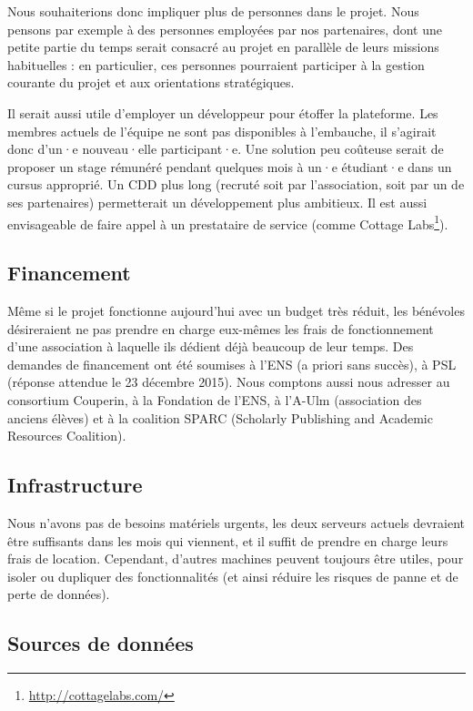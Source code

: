 \documentclass[a4paper]{article}
\begin{document}
Nous souhaiterions donc impliquer
plus de personnes dans le projet. Nous pensons par exemple à des personnes employées par nos
partenaires, dont une petite partie du temps serait consacré au projet en parallèle
de leurs missions habituelles : en particulier, 
ces personnes pourraient participer à la gestion courante
du projet et aux orientations stratégiques.

Il serait aussi utile d'employer un développeur pour étoffer la plateforme.
Les membres actuels de l'équipe ne sont pas disponibles à l'embauche, il s'agirait donc
d'un·e nouveau·elle participant·e. Une solution peu coûteuse
serait de proposer un stage rémunéré pendant quelques mois à un·e étudiant·e
dans un cursus approprié. Un CDD plus long (recruté soit par l'association,
soit par un de ses partenaires) permetterait un développement plus ambitieux.
Il est aussi envisageable de faire appel à un prestataire de service (comme Cottage
Labs\footnote{\url{http://cottagelabs.com/}}).

\subsection{Financement}

Même si le projet fonctionne aujourd'hui avec un budget très réduit, les bénévoles désireraient ne pas prendre en charge eux-mêmes les frais de fonctionnement d'une association à laquelle ils dédient déjà beaucoup de leur temps. Des demandes de financement ont été soumises à l'ENS (a priori sans succès),
à PSL (réponse attendue le 23 décembre 2015). Nous comptons aussi nous adresser au consortium Couperin, à la Fondation de l'ENS, à l'A-Ulm (association des anciens élèves) et à la coalition SPARC (Scholarly Publishing and Academic Resources Coalition).

\subsection{Infrastructure}

Nous n'avons pas de besoins matériels urgents, les deux serveurs actuels devraient être suffisants dans les mois qui viennent, et il suffit de prendre en charge leurs frais de location. Cependant, d'autres machines peuvent toujours être utiles, pour isoler ou dupliquer des fonctionnalités (et ainsi réduire les risques de panne et de perte de données).

\subsection{Sources de données}
\end{document}
